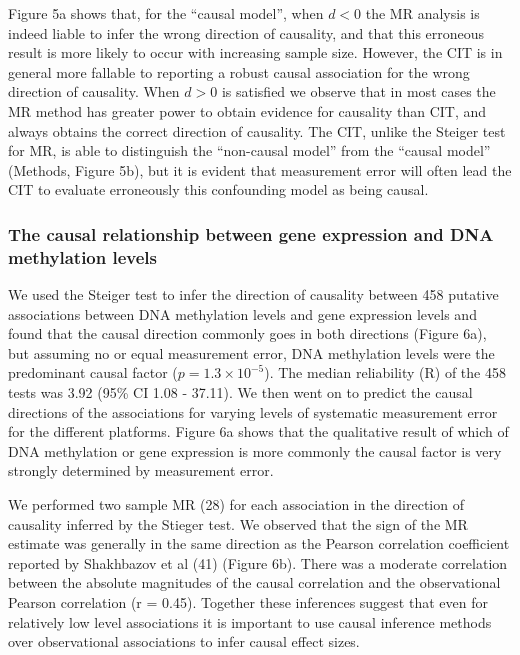 \documentclass[]{article}
\begin{document}
Figure 5a shows that, for the ``causal model'', when \(d < 0\) the MR
analysis is indeed liable to infer the wrong direction of causality, and
that this erroneous result is more likely to occur with increasing
sample size. However, the CIT is in general more fallable to reporting a
robust causal association for the wrong direction of causality. When
\(d > 0\) is satisfied we observe that in most cases the MR method has
greater power to obtain evidence for causality than CIT, and always
obtains the correct direction of causality. The CIT, unlike the Steiger
test for MR, is able to distinguish the ``non-causal model'' from the
``causal model'' (Methods, Figure 5b), but it is evident that
measurement error will often lead the CIT to evaluate erroneously this
confounding model as being causal.

\subsubsection{The causal relationship between gene expression and DNA
methylation
levels}\label{the-causal-relationship-between-gene-expression-and-dna-methylation-levels}

We used the Steiger test to infer the direction of causality between 458
putative associations between DNA methylation levels and gene expression
levels and found that the causal direction commonly goes in both
directions (Figure 6a), but assuming no or equal measurement error, DNA
methylation levels were the predominant causal factor
(\(p = 1.3\times 10^{-5}\)). The median reliability (R) of the 458 tests
was 3.92 (95\% CI 1.08 - 37.11). We then went on to predict the causal
directions of the associations for varying levels of systematic
measurement error for the different platforms. Figure 6a shows that the
qualitative result of which of DNA methylation or gene expression is
more commonly the causal factor is very strongly determined by
measurement error.

We performed two sample MR (28) for each association in the direction of
causality inferred by the Stieger test. We observed that the sign of the
MR estimate was generally in the same direction as the Pearson
correlation coefficient reported by Shakhbazov et al (41) (Figure 6b).
There was a moderate correlation between the absolute magnitudes of the
causal correlation and the observational Pearson correlation (r = 0.45).
Together these inferences suggest that even for relatively low level
associations it is important to use causal inference methods over
observational associations to infer causal effect sizes.
\end{document}
